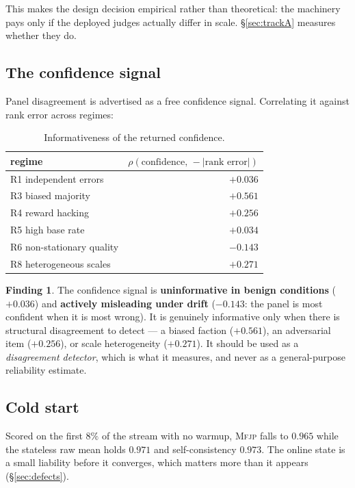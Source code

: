 \documentclass[11pt]{article}
\theoremstyle{definition}
\newtheorem{finding}{Finding}
\newcommand{\mfjp}{\textsc{Mfjp}}
\begin{document}
This makes the design decision empirical rather than theoretical: the machinery pays only if
the deployed judges actually differ in scale. \S\ref{sec:trackA} measures whether they do.

\subsection{The confidence signal}

Panel disagreement is advertised as a free confidence signal. Correlating it against rank
error across regimes:

\begin{table}[H]\centering
\begin{tabular}{lr}
\toprule
regime & $\rho(\text{confidence},\,-|\text{rank error}|)$ \\
\midrule
R1 independent errors            & $+0.036$ \\
R3 biased majority               & $+0.561$ \\
R4 reward hacking                & $+0.256$ \\
R5 high base rate                & $+0.034$ \\
R6 non-stationary quality        & $\mathbf{-0.143}$ \\
R8 heterogeneous scales          & $+0.271$ \\
\bottomrule
\end{tabular}
\caption{Informativeness of the returned confidence.}
\end{table}

\begin{finding}
The confidence signal is \textbf{uninformative in benign conditions} ($+0.036$) and
\textbf{actively misleading under drift} ($-0.143$: the panel is most confident when it is
most wrong). It is genuinely informative only when there is structural disagreement to detect
--- a biased faction ($+0.561$), an adversarial item ($+0.256$), or scale heterogeneity
($+0.271$). It should be used as a \emph{disagreement detector}, which is what it measures,
and never as a general-purpose reliability estimate.
\end{finding}

\subsection{Cold start}

Scored on the first $8\%$ of the stream with no warmup, \mfjp{} falls to $0.965$ while the
stateless raw mean holds $0.971$ and self-consistency $0.973$. The online state is a small
liability before it converges, which matters more than it appears (\S\ref{sec:defects}).
\end{document}
